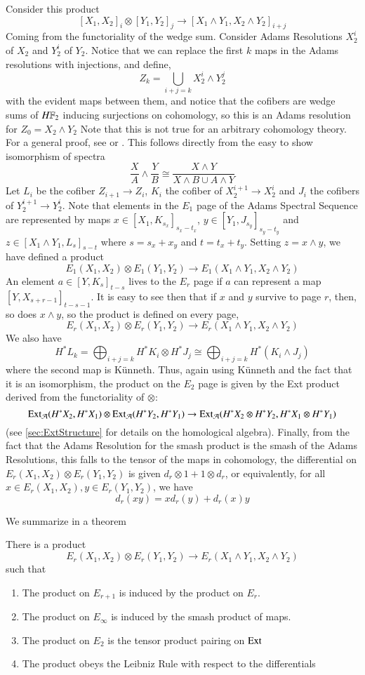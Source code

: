 Consider this product
\[[X_1,X_2]_i\otimes[Y_1,Y_2]_j\to [X_1\wedge Y_1,X_2\wedge Y_2]_{i+j}\]
Coming from the functoriality of the wedge sum.  
Consider Adams Resolutions $X_2^{i}$ of $X_2$ and $Y_2^i$ of $Y_2$.  
Notice that we can replace the first $k$ maps in the Adams resolutions with injections, and define,
\[Z_k=\bigcup_{i+j=k} X_2^i\wedge Y_2^j\]
with the evident maps between them, and notice that the cofibers are wedge sums of $H\mathbb{F}_2$ inducing surjections on cohomology, so this is an Adams resolution for $Z_0=X_2\wedge Y_2$ Note that this is not true for an arbitrary cohomology theory. For a general proof, see \cite[Ch~2.3]{RavenelGreen} or \cite[Ch~IV]{H00RingSpectra}.   
This follows directly from the easy to show isomorphism of spectra
\[\frac{X}{A}\wedge \frac{Y}{B}\cong\frac{X\wedge Y}{X\wedge B\cup A\wedge Y}\]
Let $L_i$ be the cofiber $Z_{i+1}\to Z_i$, $K_i$ the cofiber of $X_2^{i+1}\to X_2^i$ and $J_i$ the cofibers of  $Y_2^{i+1}\to Y_2^i$.
Note that elements in the $E_1$ page of the Adams Spectral Sequence are represented by maps $x\in [X_1,K_{s_x}]_{s_x-t_x}$, $y\in [Y_1,J_{s_y}]_{s_y-t_y}$ and $z\in [X_1\wedge Y_1,L_s]_{s-t}$ where $s=s_x+x_y$ and $t=t_x+t_y$.  Setting $z=x\wedge y$, we have defined a product
\[E_1(X_1,X_2)\otimes E_1(Y_1,Y_2)\to E_1(X_1\wedge Y_1,X_2\wedge Y_2)\]
An element $a\in [Y,K_s]_{t-s}$ lives to the $E_r$ page if $a$ can represent a map $[Y,X_{s+r-1}]_{t-s-1}$.  
It is easy to see then that if $x$ and $y$ survive to page $r$, then, so does $x\wedge y$, so the product is defined on every page,  
\[E_r(X_1,X_2)\otimes E_r(Y_1,Y_2)\to E_r(X_1\wedge Y_1,X_2\wedge Y_2)\]
We also have
\[H^*L_k=\bigoplus_{i+j=k} H^*K_i\otimes H^*J_j\cong\bigoplus_{i+j=k} H^*(K_i\wedge J_j)\]
where the second map is K\"{u}nneth. 
Thus, again using K\"{u}nneth and the fact that it is an isomorphism, the product on the $E_2$ page is given by the Ext product derived from the functoriality of $\otimes$:
\[\operatorname{Ext}\nolimits_{\mathcal{A}}(H^*X_2,H^*X_1)\otimes \operatorname{Ext}\nolimits_{\mathcal{A}}(H^*Y_2,H^*Y_1)\to \operatorname{Ext}\nolimits_{\mathcal{A}}(H^*X_2\otimes H^*Y_2,H^*X_1\otimes H^*Y_1)\]
(see \ref{sec:ExtStructure} for details on the homological algebra).  
Finally, from the fact that the Adams Resolution for the smash product is the smash of the Adams Resolutions, this falls to the tensor of the maps in cohomology, the differential on $E_r(X_1,X_2)\otimes E_r(Y_1,Y_2)$ is given $d_r\otimes 1+1\otimes d_r$, or equivalently, for all $x\in E_r(X_1,X_2),y\in  E_r(Y_1,Y_2)$, we have
\[d_r(xy)=xd_r(y)+d_r(x)y\]

We summarize in a theorem
\begin{Theorem}
  There is a product
  \[E_r(X_1,X_2)\otimes E_r(Y_1,Y_2)\to E_r(X_1\wedge Y_1,X_2\wedge Y_2)\]
  such that
  \begin{enumerate}
    \item The product on $E_{r+1}$ is induced by the product on $E_r$.
    \item The product on $E_\infty$ is induced by the smash product of maps.
    \item The product on $E_2$ is the tensor product pairing on $\operatorname{Ext}\nolimits$
    \item The product obeys the Leibniz Rule with respect to the differentials
  \end{enumerate}
\end{Theorem}


